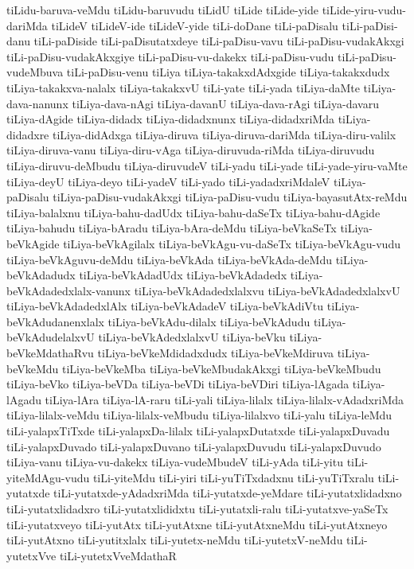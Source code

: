 {tiLidu-baruva-veMdu
tiLidu-baruvudu
tiLidU
tiLide
tiLide-yide
tiLide-yiru-vudu-dariMda
tiLideV
tiLideV-ide
tiLideV-yide
tiLi-doDane
tiLi-paDisalu
tiLi-paDisi-danu
tiLi-paDiside
tiLi-paDisutatxdeye
tiLi-paDisu-vavu
tiLi-paDisu-vudakAkxgi
tiLi-paDisu-vudakAkxgiye
tiLi-paDisu-vu-dakekx
tiLi-paDisu-vudu
tiLi-paDisu-vudeMbuva
tiLi-paDisu-venu
tiLiya
tiLiya-takakxdAdxgide
tiLiya-takakxdudx
tiLiya-takakxva-nalalx
tiLiya-takakxvU
tiLi-yate
tiLi-yada
tiLiya-daMte
tiLiya-dava-nanunx
tiLiya-dava-nAgi
tiLiya-davanU
tiLiya-dava-rAgi
tiLiya-davaru
tiLiya-dAgide
tiLiya-didadx
tiLiya-didadxnunx
tiLiya-didadxriMda
tiLiya-didadxre
tiLiya-didAdxga
tiLiya-diruva
tiLiya-diruva-dariMda
tiLiya-diru-valilx
tiLiya-diruva-vanu
tiLiya-diru-vAga
tiLiya-diruvuda-riMda
tiLiya-diruvudu
tiLiya-diruvu-deMbudu
tiLiya-diruvudeV
tiLi-yadu
tiLi-yade
tiLi-yade-yiru-vaMte
tiLiya-deyU
tiLiya-deyo
tiLi-yadeV
tiLi-yado
tiLi-yadadxriMdaleV
tiLiya-paDisalu
tiLiya-paDisu-vudakAkxgi
tiLiya-paDisu-vudu
tiLiya-bayasutAtx-reMdu
tiLiya-balalxnu
tiLiya-bahu-dadUdx
tiLiya-bahu-daSeTx
tiLiya-bahu-dAgide
tiLiya-bahudu
tiLiya-bAradu
tiLiya-bAra-deMdu
tiLiya-beVkaSeTx
tiLiya-beVkAgide
tiLiya-beVkAgilalx
tiLiya-beVkAgu-vu-daSeTx
tiLiya-beVkAgu-vudu
tiLiya-beVkAguvu-deMdu
tiLiya-beVkAda
tiLiya-beVkAda-deMdu
tiLiya-beVkAdadudx
tiLiya-beVkAdadUdx
tiLiya-beVkAdadedx
tiLiya-beVkAdadedxlalx-vanunx
tiLiya-beVkAdadedxlalxvu
tiLiya-beVkAdadedxlalxvU
tiLiya-beVkAdadedxlAlx
tiLiya-beVkAdadeV
tiLiya-beVkAdiVtu
tiLiya-beVkAdudanenxlalx
tiLiya-beVkAdu-dilalx
tiLiya-beVkAdudu
tiLiya-beVkAdudelalxvU
tiLiya-beVkAdedxlalxvU
tiLiya-beVku
tiLiya-beVkeMdathaRvu
tiLiya-beVkeMdidadxdudx
tiLiya-beVkeMdiruva
tiLiya-beVkeMdu
tiLiya-beVkeMba
tiLiya-beVkeMbudakAkxgi
tiLiya-beVkeMbudu
tiLiya-beVko
tiLiya-beVDa
tiLiya-beVDi
tiLiya-beVDiri
tiLiya-lAgada
tiLiya-lAgadu
tiLiya-lAra
tiLiya-lA-raru
tiLi-yali
tiLiya-lilalx
tiLiya-lilalx-vAdadxriMda
tiLiya-lilalx-veMdu
tiLiya-lilalx-veMbudu
tiLiya-lilalxvo
tiLi-yalu
tiLiya-leMdu
tiLi-yalapxTiTxde
tiLi-yalapxDa-lilalx
tiLi-yalapxDutatxde
tiLi-yalapxDuvadu
tiLi-yalapxDuvado
tiLi-yalapxDuvano
tiLi-yalapxDuvudu
tiLi-yalapxDuvudo
tiLiya-vanu
tiLiya-vu-dakekx
tiLiya-vudeMbudeV
tiLi-yAda
tiLi-yitu
tiLi-yiteMdAgu-vudu
tiLi-yiteMdu
tiLi-yiri
tiLi-yuTiTxdadxnu
tiLi-yuTiTxralu
tiLi-yutatxde
tiLi-yutatxde-yAdadxriMda
tiLi-yutatxde-yeMdare
tiLi-yutatxlidadxno
tiLi-yutatxlidadxro
tiLi-yutatxlididxtu
tiLi-yutatxli-ralu
tiLi-yutatxve-yaSeTx
tiLi-yutatxveyo
tiLi-yutAtx
tiLi-yutAtxne
tiLi-yutAtxneMdu
tiLi-yutAtxneyo
tiLi-yutAtxno
tiLi-yutitxlalx
tiLi-yutetx-neMdu
tiLi-yutetxV-neMdu
tiLi-yutetxVve
tiLi-yutetxVveMdathaR
}
